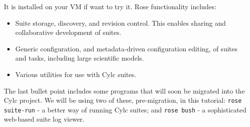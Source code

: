 It is installed on your VM if want to try it.  Rose functionality
includes:
\begin{itemize}
    \item Suite storage, discovery, and revision control.  This enables sharing
        and collaborative development of suites.
    \item Generic configuration, and metadata-driven configuration editing, of
        suites and tasks, including large scientific models.
    \item Various utilities for use with Cylc suites.
\end{itemize}

The last bullet point includes some programs that will soon be migrated into
the Cylc project.  We will be using two of these, pre-migration, in this
tutorial: \lstinline{rose suite-run} - a better way of running Cylc suites; and
\lstinline{rose bush} - a sophisticated web-based suite log viewer.
